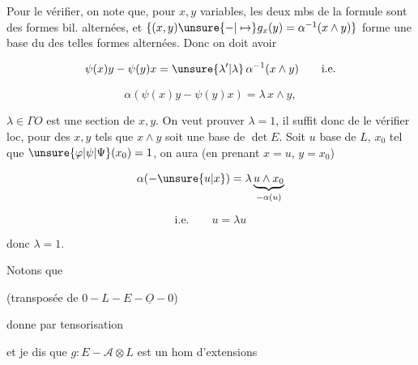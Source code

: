 

Pour le vérifier, on note que, pour $x,y$ variables, les deux mbs de la formule sont des formes bil. alternées, et $\{(x,y)\unsure{-|\mapsto}g_x(y)=\alpha^{-1}(x\wedge y)\}$ forme une base du   des telles formes alternées. Donc on doit avoir

\[ \psi(x)y-\psi(y)x=\unsure{\lambda'|\lambda}\,\alpha^{-1}(x\wedge y)\qquad\text{i.e.} \]


\[ \alpha(\psi(x)y-\psi(y)x)=\lambda\,x\wedge y, \]

  $\lambda\in\Gamma O$ est une section  de $x,y$. On veut prouver $\lambda=1$, il suffit donc de le vérifier loc, pour des $x,y$ tels que $x\wedge y$ soit une base de $\det E$. Soit $u$ base de $L$, $x_0$ tel que $\unsure{\varphi|\psi|\Psi}(x_0)=1$, on aura (en prenant $x=u$, $y=x_0$)

\[ \alpha(-\unsure{u|x})=\lambda\underbrace{u\wedge x_0}_{-\alpha(u)} \]

\[ \text{i.e.}\qquad u=\lambda u \]

donc  $\lambda=1$.

Notons que


(transposée de $0-L-E-\underline O-0$)

donne par tensorisation


et je dis que $g:E-\mathcal A\otimes L$ est un hom d'extensions
